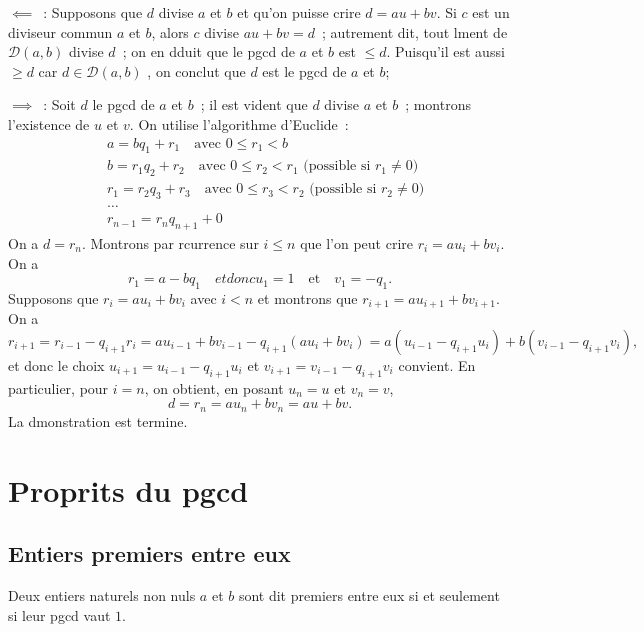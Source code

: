 \documentclass[a4paper,fleqn,openany]{trmbook}
\newcommand*{\ensdiv}[1]{\mathcal{D}(#1)}
\begin{document}
\begin{demonstration}
$\impliedby$~: Supposons que $d$ divise $a$ et $b$ et qu'on puisse crire $d=au+bv$. Si $c$ est un diviseur commun  $a$ et $b$, alors $c$ divise $au+bv = d$~; autrement dit, tout lment de $\ensdiv{a,b}$ divise $d$~; on en dduit que le pgcd de $a$ et $b$ est $\leq d$. Puisqu'il est aussi $\geq d$ car $d \in \ensdiv{a,b}$ , on conclut que $d$ est le pgcd de $a$ et $b$;

$\implies$~: Soit $d$ le pgcd de $a$ et $b$~; il est vident que $d$ divise $a$ et $b$~; montrons l'existence de $u$ et $v$. On utilise l'algorithme d'Euclide~:
\begin{align*}
& a=bq_1+r_1 \quad \text{avec $0 \leq r_1 < b$} \\
& b=r_1q_2+r_2 \quad \text{avec $0 \leq r_2 < r_1$ (possible si $r_1 \neq 0$)} \\
& r_1=r_2q_3+r_3 \quad \text{avec $0 \leq r_3 < r_2$ (possible si $r_2 \neq 0$)} \\
& \dots \\
& r_{n-1} = r_n q_{n+1} + 0
\end{align*}
On a $d = r_{n}$. Montrons par rcurrence sur $i \leq n$ que l'on peut crire $r_i = a u_i + b v_i$. On a
\[r_1 = a - bq_1 \quad{et donc} u_1 = 1 \quad \text{et} \quad v_1 = -q_1.\]
Supposons que $r_i = au_i+bv_i$ avec $i < n$ et montrons que $r_{i+1} = au_{i+1} + bv_{i+1}$. On a
\[r_{i+1} = r_{i-1} - q_{i+1} r_i = a u_{i-1} + b v_{i-1} - q_{i+1} (a u_{i} + b v_{i}) = a (u_{i-1} - q_{i+1} u_{i}) + b(v_{i-1} - q_{i+1} v_{i}),\]
et donc le choix $u_{i+1} = u_{i-1} - q_{i+1} u_{i}$ et $v_{i+1} = v_{i-1} - q_{i+1} v_{i}$ convient. En particulier, pour $i=n$, on obtient, en posant $u_n = u$ et $v_n = v$,
\[d = r_n = a u_n + b v_n = au + bv.\]
La dmonstration est termine.
\end{demonstration}

\section{Proprits du pgcd}

\subsection{Entiers premiers entre eux}

\begin{definition}
Deux entiers naturels non nuls $a$ et $b$ sont dit premiers entre eux si et seulement si leur pgcd vaut $1$.
\end{definition}
\end{document}
